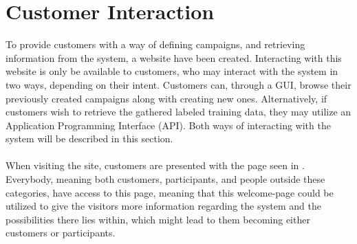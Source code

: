 
\section{Customer Interaction}
\label{sec:customer_interaction}

To provide customers with a way of defining campaigns, and retrieving information from the system, a website have been created. Interacting with this website is only be available to customers, who may interact with the system in two ways, depending on their intent. Customers can, through a GUI, browse their previously created campaigns along with creating new ones. Alternatively, if customers wish to retrieve the gathered labeled training data, they may utilize an Application Programming Interface (API). Both ways of interacting with the system will be described in this section.
\\\\
When visiting the site, customers are presented with the page seen in . Everybody, meaning both customers, participants, and people outside these categories, have access to this page, meaning that this welcome-page could be utilized to give the visitors more information regarding the system and the possibilities there lies within, which might lead to them becoming either customers or participants. 



 



